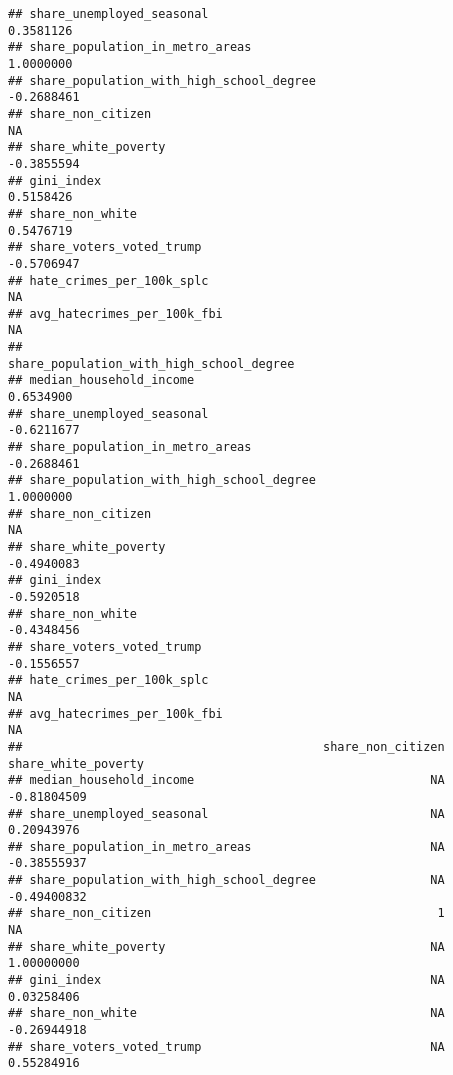\documentclass[
]{article}
\begin{document}
\begin{verbatim}
## share_unemployed_seasonal                                      0.3581126
## share_population_in_metro_areas                                1.0000000
## share_population_with_high_school_degree                      -0.2688461
## share_non_citizen                                                     NA
## share_white_poverty                                           -0.3855594
## gini_index                                                     0.5158426
## share_non_white                                                0.5476719
## share_voters_voted_trump                                      -0.5706947
## hate_crimes_per_100k_splc                                             NA
## avg_hatecrimes_per_100k_fbi                                           NA
##                                          share_population_with_high_school_degree
## median_household_income                                                 0.6534900
## share_unemployed_seasonal                                              -0.6211677
## share_population_in_metro_areas                                        -0.2688461
## share_population_with_high_school_degree                                1.0000000
## share_non_citizen                                                              NA
## share_white_poverty                                                    -0.4940083
## gini_index                                                             -0.5920518
## share_non_white                                                        -0.4348456
## share_voters_voted_trump                                               -0.1556557
## hate_crimes_per_100k_splc                                                      NA
## avg_hatecrimes_per_100k_fbi                                                    NA
##                                          share_non_citizen share_white_poverty
## median_household_income                                 NA         -0.81804509
## share_unemployed_seasonal                               NA          0.20943976
## share_population_in_metro_areas                         NA         -0.38555937
## share_population_with_high_school_degree                NA         -0.49400832
## share_non_citizen                                        1                  NA
## share_white_poverty                                     NA          1.00000000
## gini_index                                              NA          0.03258406
## share_non_white                                         NA         -0.26944918
## share_voters_voted_trump                                NA          0.55284916

\end{verbatim}
\end{document}
